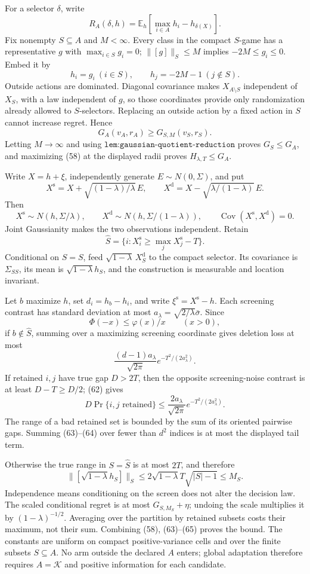 For a selector \(\delta\), write
\[
R_A(\delta,h)=\mathbb E_h[\max_{i\in A}h_i-h_{\delta(X)}]. \tag{56}
\]
Fix nonempty \(S\subseteq A\) and \(M<\infty\).  Every class in the compact \(S\)-game has a representative \(g\) with \(\max_{i\in S}g_i=0\); \(\lVert[g]\rVert_S\leq M\) implies \(-2M\leq g_i\leq0\).  Embed it by
\[
h_i=g_i\ (i\in S),\qquad h_j=-2M-1\ (j\notin S). \tag{57}
\]
Outside actions are dominated.  Diagonal covariance makes \(X_{A\setminus S}\) independent of \(X_S\), with a law independent of \(g\), so those coordinates provide only randomization already allowed to \(S\)-selectors.  Replacing an outside action by a fixed action in \(S\) cannot increase regret.  Hence
\[
G_A(v_A,r_A)\geq G_{S,M}(v_S,r_S). \tag{58}
\]
Letting \(M\to\infty\) and using \(\texttt{lem:gaussian-quotient-reduction}\) proves \(G_S\leq G_A\), and maximizing (58) at the displayed radii proves \(H_{\lambda,T}\leq G_A\).

Write \(X=h+\xi\), independently generate \(E\sim N(0,\Sigma)\), and put
\[
X^{\mathrm s}=X+\sqrt{(1-\lambda)/\lambda}\,E,\qquad
X^{\mathrm d}=X-\sqrt{\lambda/(1-\lambda)}\,E. \tag{59}
\]
Then
\[
X^{\mathrm s}\sim N(h,\Sigma/\lambda),\qquad
X^{\mathrm d}\sim N(h,\Sigma/(1-\lambda)),\qquad
\operatorname{Cov}(X^{\mathrm s},X^{\mathrm d})=0. \tag{60}
\]
Joint Gaussianity makes the two observations independent.  Retain
\[
\widehat S=\{i:X_i^{\mathrm s}\geq\max_jX_j^{\mathrm s}-T\}. \tag{61}
\]
Conditional on \(\widehat S=S\), feed \(\sqrt{1-\lambda}\,X_S^{\mathrm d}\) to the compact selector.  Its covariance is \(\Sigma_{SS}\), its mean is \(\sqrt{1-\lambda}h_S\), and the construction is measurable and location invariant.

Let \(b\) maximize \(h\), set \(d_i=h_b-h_i\), and write \(\xi^{\mathrm s}=X^{\mathrm s}-h\).  Each screening contrast has standard deviation at most \(a_\lambda=\sqrt{2/\lambda}\bar\sigma\).  Since
\[
\Phi(-x)\leq\varphi(x)/x\qquad(x>0), \tag{62}
\]
if \(b\notin\widehat S\), summing over a maximizing screening coordinate gives deletion loss at most
\[
\frac{(d-1)a_\lambda}{\sqrt{2\pi}}
e^{-T^2/(2a_\lambda^2)}. \tag{63}
\]
If retained \(i,j\) have true gap \(D>2T\), then the opposite screening-noise contrast is at least \(D-T\geq D/2\); (62) gives
\[
D\Pr\{i,j\text{ retained}\}
\leq\frac{2a_\lambda}{\sqrt{2\pi}}e^{-T^2/(2a_\lambda^2)}. \tag{64}
\]
The range of a bad retained set is bounded by the sum of its oriented pairwise gaps.  Summing (63)--(64) over fewer than \(d^2\) indices is at most the displayed tail term.

Otherwise the true range in \(S=\widehat S\) is at most \(2T\), and therefore
\[
\lVert[\sqrt{1-\lambda}h_S]\rVert_S
\leq2\sqrt{1-\lambda}T\sqrt{|S|-1}\leq M_S. \tag{65}
\]
Independence means conditioning on the screen does not alter the decision law.  The scaled conditional regret is at most \(G_{S,M_S}+\eta\); undoing the scale multiplies it by \((1-\lambda)^{-1/2}\).  Averaging over the partition by retained subsets costs their maximum, not their sum.  Combining (58), (63)--(65) proves the bound.  The constants are uniform on compact positive-variance cells and over the finite subsets \(S\subseteq A\).  No arm outside the declared \(A\) enters; global adaptation therefore requires \(A=\mathcal K\) and positive information for each candidate.